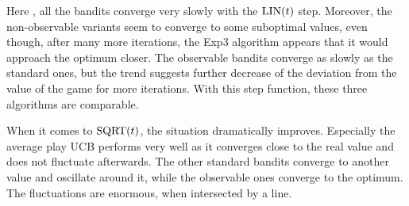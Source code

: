 \documentclass[../main.tex]{subfiles}
\begin{document}
Here , all the bandits converge very slowly with the $\text{LIN}(t)$ step.
Moreover, the non-observable variants seem to converge to some suboptimal values, even though, after many more iterations, the Exp3 algorithm appears that it would approach the optimum closer.
The observable bandits converge as slowly as the standard ones, but the trend suggests further decrease of the deviation from the value of the game for more iterations.
With this step function, these three algorithms are comparable.

When it comes to $\text{SQRT}(t)$, the situation dramatically improves.
Especially the average play UCB performs very well as it converges close to the real value and does not fluctuate afterwards.
The other standard bandits converge to another value and oscillate around it, while the observable ones converge to the optimum.
The fluctuations are enormous, when intersected by a line.
\end{document}
